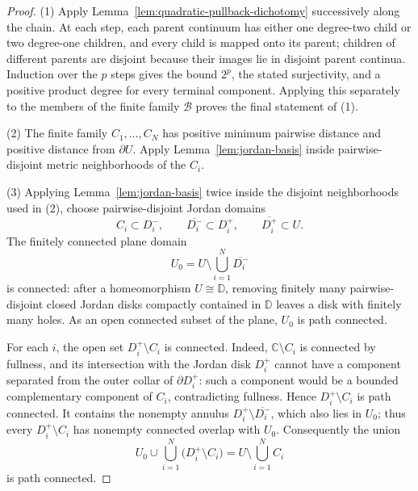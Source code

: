 \begin{proof}
(1)  Apply Lemma~\ref{lem:quadratic-pullback-dichotomy} successively
along the chain.  At each step, each parent continuum has either one
degree-two child or two degree-one children, and every child is mapped
onto its parent; children of different parents are disjoint because
their images lie in disjoint parent continua.  Induction over the
\(p\) steps gives the bound \(2^p\), the stated surjectivity, and a
positive product degree for every terminal component.  Applying this
separately to the members of the finite family \(\mathcal B\) proves
the final statement of (1).

(2)  The finite family \(C_1,\dots,C_N\) has positive minimum pairwise
distance and positive distance from \(\partial U\).  Apply
Lemma~\ref{lem:jordan-basis} inside pairwise-disjoint metric
neighborhoods of the \(C_i\).

(3)  Applying Lemma~\ref{lem:jordan-basis} twice inside the disjoint
neighborhoods used in (2), choose pairwise-disjoint Jordan domains
\[
 C_i\subset D_i^-,\qquad
 \overline{D_i^-}\subset D_i^+,\qquad
 \overline{D_i^+}\subset U .
\]
The finitely connected plane domain
\[
 U_0=U\setminus\bigcup_{i=1}^N\overline{D_i^-}
\]
is connected: after a homeomorphism \(U\cong\mathbb D\), removing
finitely many pairwise-disjoint closed Jordan disks compactly
contained in \(\mathbb D\) leaves a disk with finitely many holes.  As
an open connected subset of the plane, \(U_0\) is path connected.

For each \(i\), the open set \(D_i^+\setminus C_i\) is connected.
Indeed, \(\mathbb C\setminus C_i\) is connected by fullness, and its
intersection with the Jordan disk \(D_i^+\) cannot have a component
separated from the outer collar of \(\partial D_i^+\): such a
component would be a bounded complementary component of \(C_i\),
contradicting fullness.  Hence \(D_i^+\setminus C_i\) is path
connected.  It contains the nonempty annulus
\(D_i^+\setminus\overline{D_i^-}\), which also lies in \(U_0\); thus
every \(D_i^+\setminus C_i\) has nonempty connected overlap with
\(U_0\).  Consequently the union
\[
 U_0\cup\bigcup_{i=1}^N\bigl(D_i^+\setminus C_i\bigr)
 =U\setminus\bigcup_{i=1}^N C_i
\]
is path connected.
\end{proof}